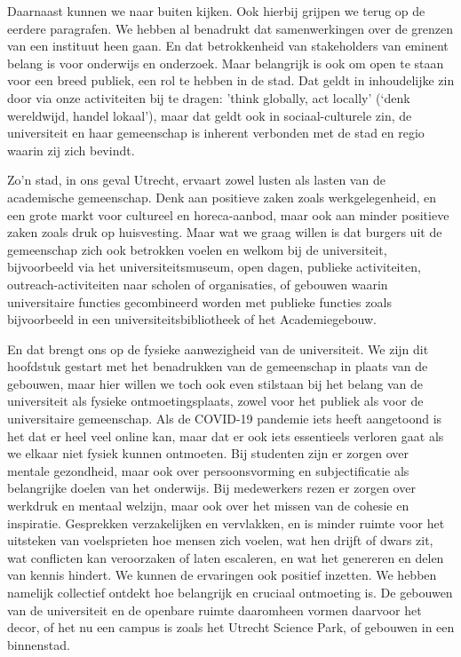 \documentclass[empirical, authordate, ]{new-jote-article}
\begin{document}
	Daarnaast kunnen we naar buiten kijken. Ook hierbij grijpen we terug op de eerdere paragrafen. We hebben al benadrukt dat samenwerkingen over de grenzen van een instituut heen gaan. En dat betrokkenheid van stakeholders van eminent belang is voor onderwijs en onderzoek. Maar belangrijk is ook om open te staan voor een breed publiek, een rol te hebben in de stad. Dat geldt in inhoudelijke zin door via onze activiteiten bij te dragen: 'think globally, act locally' (‘denk wereldwijd, handel lokaal'), maar dat geldt ook in sociaal-culturele zin, de universiteit en haar gemeenschap is inherent verbonden met de stad en regio waarin zij zich bevindt.



	Zo'n stad, in ons geval Utrecht, ervaart zowel lusten als lasten van de academische gemeenschap. Denk aan positieve zaken zoals werkgelegenheid, en een grote markt voor cultureel en horeca-aanbod, maar ook aan minder positieve zaken zoals druk op huisvesting. Maar wat we graag willen is dat burgers uit de gemeenschap zich ook betrokken voelen en welkom bij de universiteit, bijvoorbeeld via het universiteitsmuseum, open dagen, publieke activiteiten, outreach-activiteiten naar scholen of organisaties, of gebouwen waarin universitaire functies gecombineerd worden met publieke functies zoals bijvoorbeeld in een universiteitsbibliotheek of het Academiegebouw.



	En dat brengt ons op de fysieke aanwezigheid van de universiteit. We zijn dit hoofdstuk gestart met het benadrukken van de gemeenschap in plaats van de gebouwen, maar hier willen we toch ook even stilstaan bij het belang van de universiteit als fysieke ontmoetingsplaats, zowel voor het publiek als voor de universitaire gemeenschap. Als de COVID-19 pandemie iets heeft aangetoond is het dat er heel veel online kan, maar dat er ook iets essentieels verloren gaat als we elkaar niet fysiek kunnen ontmoeten. Bij studenten zijn er zorgen over mentale gezondheid, maar ook over persoonsvorming en subjectificatie als belangrijke doelen van het onderwijs. Bij medewerkers rezen er zorgen over werkdruk en mentaal welzijn, maar ook over het missen van de cohesie en inspiratie. Gesprekken verzakelijken en vervlakken, en is minder ruimte voor het uitsteken van voelsprieten hoe mensen zich voelen, wat hen drijft of dwars zit, wat conflicten kan veroorzaken of laten escaleren, en wat het genereren en delen van kennis hindert. We kunnen de ervaringen ook positief inzetten. We hebben namelijk collectief ontdekt hoe belangrijk en cruciaal ontmoeting is. De gebouwen van de universiteit en de openbare ruimte daaromheen vormen daarvoor het decor, of het nu een campus is zoals het Utrecht Science Park, of gebouwen in een binnenstad.
\end{document}
